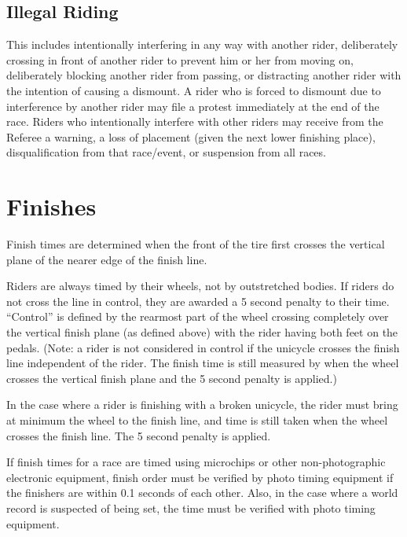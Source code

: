 \subsection{Illegal Riding}
This includes intentionally interfering in any way with another rider, deliberately crossing in front of another rider to prevent him or her from moving on, deliberately blocking another rider from passing, or distracting another rider with the intention of causing a dismount.
A rider who is forced to dismount due to interference by another rider may file a protest immediately at the end of the race.
Riders who intentionally interfere with other riders may receive from the Referee a warning, a loss of placement (given the next lower finishing place), disqualification from that race/event, or suspension from all races.

\section{Finishes}
Finish times are determined when the front of the tire first crosses the vertical plane of the nearer edge of the finish line.

Riders are always timed by their wheels, not by outstretched bodies.
If riders do not cross the line in control, they are awarded a 5 second penalty to their time.
``Control'' is defined by the rearmost part of the wheel crossing completely over the vertical finish plane (as defined above) with the rider having both feet on the pedals.
(Note: a rider is not considered in control if the unicycle crosses the finish line independent of the rider.
The finish time is still measured by when the wheel crosses the vertical finish plane and the 5 second penalty is applied.)

In the case where a rider is finishing with a broken unicycle, the rider must bring at minimum the wheel to the finish line, and time is still taken when the wheel crosses the finish line.
The 5 second penalty is applied.

If finish times for a race are timed using microchips or other non-photographic electronic equipment, finish order must be verified by photo timing equipment if the finishers are within 0.1 seconds of each other.
Also, in the case where a world record is suspected of being set, the time must be verified with photo timing equipment.

